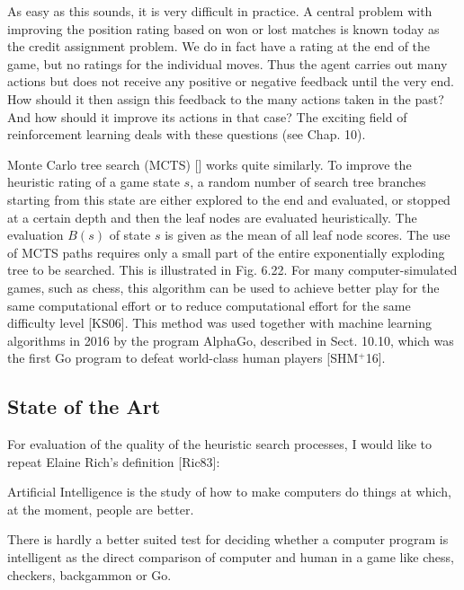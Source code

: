 \documentclass[10pt]{book}
\begin{document}
As easy as this sounds, it is very difficult in practice. A central problem with improving the position rating based on won or lost matches is known today as the credit assignment problem. We do in fact have a rating at the end of the game, but no ratings for the individual moves. Thus the agent carries out many actions but does not receive any positive or negative feedback until the very end. How should it then assign this feedback to the many actions taken in the past? And how should it improve its actions in that case? The exciting field of reinforcement learning deals with these questions (see Chap. 10).

Monte Carlo tree search (MCTS) [\cite{ks06}] works quite similarly. To improve the heuristic rating of a game state $s$, a random number of search tree branches starting from this state are either explored to the end and evaluated, or stopped at a certain depth and then the leaf nodes are evaluated heuristically. The evaluation $B(s)$ of state $s$ is given as the mean of all leaf node scores. The use of MCTS paths requires only a small part of the entire exponentially exploding tree to be searched. This is illustrated in Fig. 6.22. For many computer-simulated games, such as chess, this algorithm can be used to achieve better play for the same computational effort or to reduce computational effort for the same difficulty level [KS06]. This method was used together with machine learning algorithms in 2016 by the program AlphaGo, described in Sect. 10.10, which was the first Go program to defeat world-class human players [SHM$^{+}$16].

\subsection{State of the Art}
For evaluation of the quality of the heuristic search processes, I would like to repeat Elaine Rich's definition [Ric83]:

Artificial Intelligence is the study of how to make computers do things at which, at the moment, people are better.

There is hardly a better suited test for deciding whether a computer program is intelligent as the direct comparison of computer and human in a game like chess, checkers, backgammon or Go.
\end{document}
